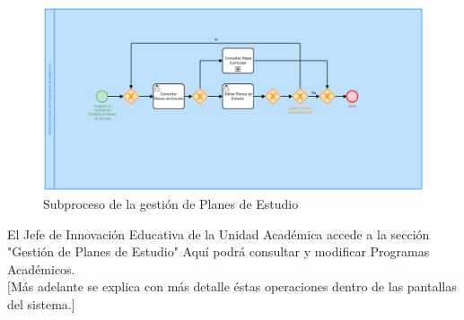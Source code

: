         \begin{figure}[H]
        	\centering
        	\hypertarget{BPMNGPE}{\includegraphics[width=\linewidth]{images/SP4-GPE/gestionPE.png}}
        	\caption{Subproceso de la gestión de Planes de Estudio}
        	\label{BPMNGPE}
        \end{figure}

        El Jefe de Innovación Educativa de la Unidad Académica accede a la sección "Gestión de Planes de Estudio" Aquí podrá consultar y modificar Programas Académicos. \\

        [Más adelante se explica con más detalle éstas operaciones dentro de las pantallas del sistema.]\\



